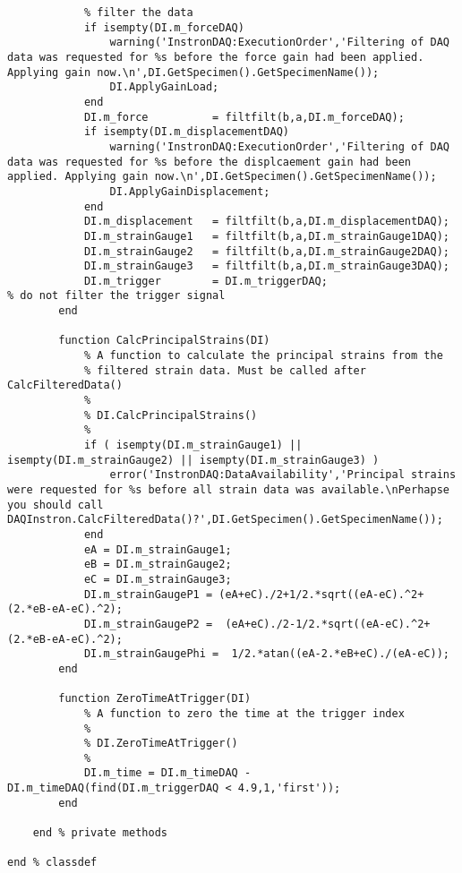 \begin{lstlisting}
            % filter the data
            if isempty(DI.m_forceDAQ)
                warning('InstronDAQ:ExecutionOrder','Filtering of DAQ data was requested for %s before the force gain had been applied. Applying gain now.\n',DI.GetSpecimen().GetSpecimenName());
                DI.ApplyGainLoad;
            end
            DI.m_force          = filtfilt(b,a,DI.m_forceDAQ);
            if isempty(DI.m_displacementDAQ)
                warning('InstronDAQ:ExecutionOrder','Filtering of DAQ data was requested for %s before the displcaement gain had been applied. Applying gain now.\n',DI.GetSpecimen().GetSpecimenName());
                DI.ApplyGainDisplacement;
            end
            DI.m_displacement   = filtfilt(b,a,DI.m_displacementDAQ);
            DI.m_strainGauge1   = filtfilt(b,a,DI.m_strainGauge1DAQ);
            DI.m_strainGauge2   = filtfilt(b,a,DI.m_strainGauge2DAQ);
            DI.m_strainGauge3   = filtfilt(b,a,DI.m_strainGauge3DAQ);
            DI.m_trigger        = DI.m_triggerDAQ;                      % do not filter the trigger signal
        end
        
        function CalcPrincipalStrains(DI)
            % A function to calculate the principal strains from the
            % filtered strain data. Must be called after CalcFilteredData()
            %
            % DI.CalcPrincipalStrains()
            %
            if ( isempty(DI.m_strainGauge1) || isempty(DI.m_strainGauge2) || isempty(DI.m_strainGauge3) )
                error('InstronDAQ:DataAvailability','Principal strains were requested for %s before all strain data was available.\nPerhapse you should call DAQInstron.CalcFilteredData()?',DI.GetSpecimen().GetSpecimenName());
            end
            eA = DI.m_strainGauge1;
            eB = DI.m_strainGauge2;
            eC = DI.m_strainGauge3;
            DI.m_strainGaugeP1 = (eA+eC)./2+1/2.*sqrt((eA-eC).^2+(2.*eB-eA-eC).^2);
            DI.m_strainGaugeP2 =  (eA+eC)./2-1/2.*sqrt((eA-eC).^2+(2.*eB-eA-eC).^2);
            DI.m_strainGaugePhi =  1/2.*atan((eA-2.*eB+eC)./(eA-eC));
        end
        
        function ZeroTimeAtTrigger(DI)
            % A function to zero the time at the trigger index
            %
            % DI.ZeroTimeAtTrigger()
            %
            DI.m_time = DI.m_timeDAQ - DI.m_timeDAQ(find(DI.m_triggerDAQ < 4.9,1,'first'));
        end
        
    end % private methods
    
end % classdef
\end{lstlisting}
